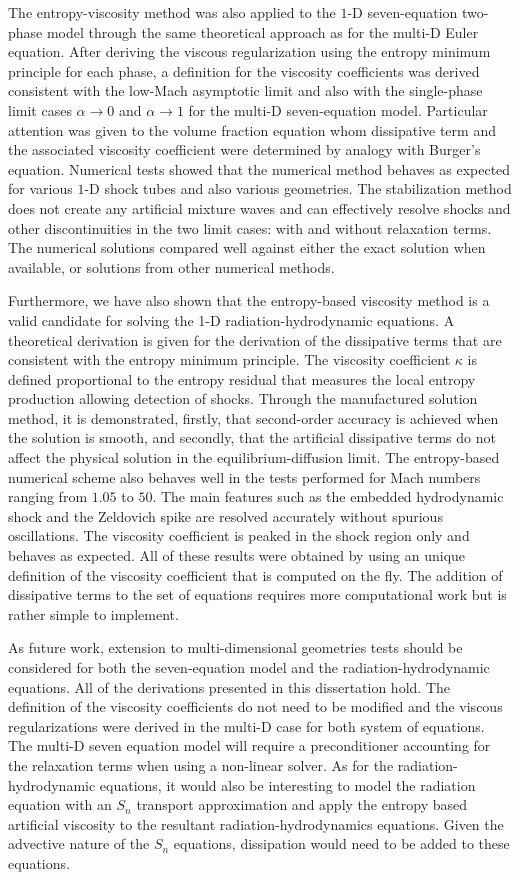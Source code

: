 The entropy-viscosity method was also applied to the $1$-D seven-equation two-phase model through the same theoretical approach as for the multi-D Euler equation. After deriving the viscous regularization using the entropy minimum principle for each phase, a definition for the viscosity coefficients was derived consistent with the low-Mach asymptotic limit and also with the single-phase limit cases $\alpha \to 0$ and $\alpha \to 1$ for the multi-D seven-equation model. Particular attention was given to the volume fraction equation whom dissipative term and the associated viscosity coefficient were determined by analogy with Burger's equation. 
Numerical tests showed that the numerical method behaves as expected for various $1$-D shock tubes and also various geometries. The stabilization method does not create any artificial mixture waves and can effectively resolve shocks and other discontinuities in the two limit cases: with and without relaxation terms. The numerical solutions compared well against either the exact solution when available, or solutions from other numerical methods.

Furthermore, we have also shown that the entropy-based viscosity method is a valid candidate for solving the 1-D radiation-hydrodynamic equations. A theoretical derivation is given for the derivation of the dissipative terms that are consistent with the entropy minimum principle. The viscosity coefficient $\kappa$ is defined proportional to the entropy residual that measures the local entropy production allowing detection of shocks. Through the manufactured solution method, it is demonstrated, firstly, that second-order accuracy is achieved when the solution is smooth, and secondly, that the artificial dissipative terms do not affect the physical solution in the equilibrium-diffusion limit. 
The entropy-based numerical scheme also behaves well in the tests performed for Mach numbers ranging from $1.05$ to $50$. The main features such as the embedded hydrodynamic shock and the Zeldovich spike are resolved accurately without spurious oscillations. The viscosity coefficient is peaked in the shock region only and behaves as expected. All of these results were obtained by using an unique definition of the viscosity coefficient that is computed on the fly. The addition of dissipative terms to the set of equations requires more computational work but is rather simple to implement.

As future work, extension to multi-dimensional geometries tests should be considered for both the seven-equation model and the radiation-hydrodynamic equations. 
All of the derivations presented in this dissertation hold. The definition of the viscosity coefficients do not need to be modified and the viscous regularizations were derived in the multi-D case for both system of equations. The multi-D seven equation model will require a preconditioner accounting for the relaxation terms when using a non-linear solver. As for the radiation-hydrodynamic equations, it would also be interesting to model the radiation equation with an $S_n$ transport approximation and apply the entropy based artificial viscosity to the resultant radiation-hydrodynamics equations. Given the advective nature of the $S_n$ equations, dissipation would need to be added to these equations.